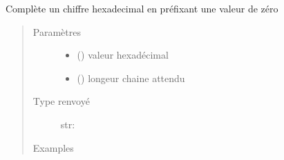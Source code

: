 \documentclass[letterpaper,10pt,french]{sphinxmanual}
\begin{document}
\begin{fulllineitems}
\label{\detokenize{modules/tools:toolbox.tools.plain_hex}}
Complète un chiffre hexadecimal en préfixant une valeur de zéro
\begin{quote}\begin{description}
\item[{Paramètres}] \leavevmode\begin{itemize}
\item {} 
 () \textendash{} valeur hexadécimal

\item {} 
 () \textendash{} longeur chaine attendu

\end{itemize}

\item[{Type renvoyé}] \leavevmode
str:

\item[{Examples}] \leavevmode
\begin{sphinxVerbatim}[commandchars=\\\{\}]
  
 
\end{sphinxVerbatim}

\end{description}\end{quote}

\end{fulllineitems}

\end{document}
